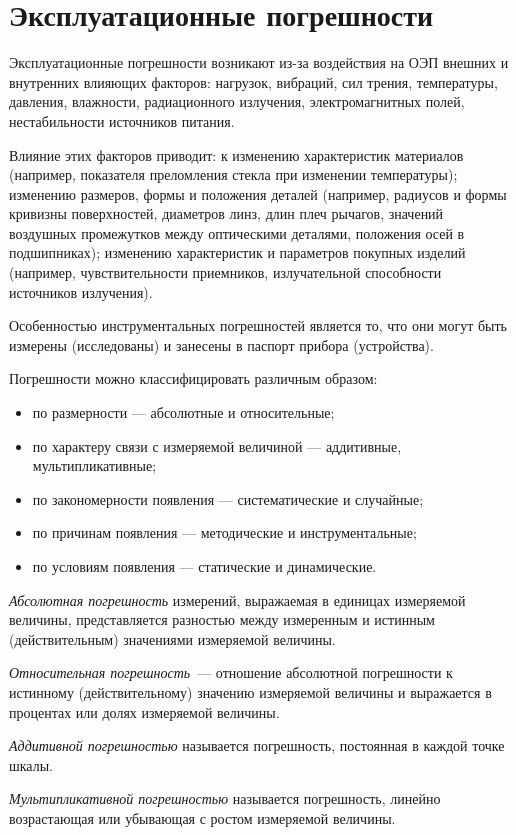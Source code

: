 \section{Эксплуатационные погрешности}
Эксплуатационные погрешности возникают из-за воздействия на ОЭП внешних и внутренних влияющих факторов: нагрузок, вибраций, сил трения, температуры, давления, влажности, радиационного излучения, электромагнитных полей, нестабильности источников питания.

Влияние этих факторов приводит: к изменению характеристик материалов (например, показателя преломления стекла при изменении температуры); изменению размеров, формы и положения деталей (например, радиусов и формы кривизны поверхностей, диаметров линз, длин плеч рычагов, значений воздушных промежутков между оптическими деталями, положения осей в подшипниках); изменению характеристик и параметров покупных изделий (например, чувствительности приемников, излучательной способности источников излучения).

Особенностью инструментальных погрешностей является то, что они могут быть измерены (исследованы) и занесены в паспорт прибора (устройства).

Погрешности можно классифицировать различным образом:
\begin{itemize}
\item по размерности --- абсолютные и относительные;
\item по характеру связи с измеряемой величиной --- аддитивные, мультипликативные;
\item по закономерности появления --- систематические и случайные;
\item по причинам появления --- методические и инструментальные;
\item по условиям появления --- статические и динамические.
\end{itemize}

\textit{Абсолютная погрешность} измерений, выражаемая в единицах измеряемой величины, представляется разностью между измеренным и истинным (действительным) значениями измеряемой величины. 

\textit{Относительная погрешность}~--- отношение абсолютной погрешности к истинному (действительному) значению измеряемой величины и выражается в процентах или долях измеряемой величины.

\textit{Аддитивной погрешностью} называется погрешность, постоянная в каждой точке шкалы.

\textit{Мультипликативной погрешностью} называется погрешность, линейно возрастающая или убывающая с ростом измеряемой величины.

